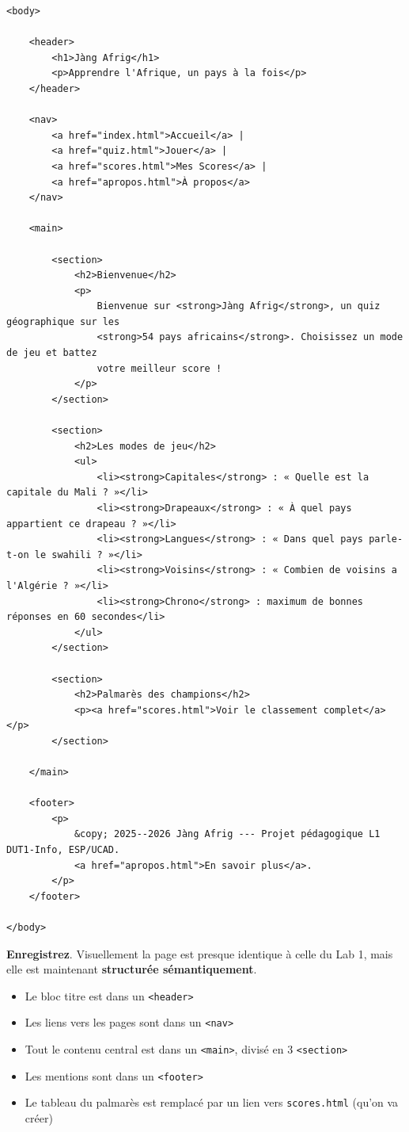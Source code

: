 \documentclass[11pt,a4paper]{article}
\newcommand{\cmark}{\ding{51}}
\begin{document}
\begin{lstlisting}[language=HTML5]
<body>

    <header>
        <h1>Jàng Afrig</h1>
        <p>Apprendre l'Afrique, un pays à la fois</p>
    </header>

    <nav>
        <a href="index.html">Accueil</a> |
        <a href="quiz.html">Jouer</a> |
        <a href="scores.html">Mes Scores</a> |
        <a href="apropos.html">À propos</a>
    </nav>

    <main>

        <section>
            <h2>Bienvenue</h2>
            <p>
                Bienvenue sur <strong>Jàng Afrig</strong>, un quiz géographique sur les
                <strong>54 pays africains</strong>. Choisissez un mode de jeu et battez
                votre meilleur score !
            </p>
        </section>

        <section>
            <h2>Les modes de jeu</h2>
            <ul>
                <li><strong>Capitales</strong> : « Quelle est la capitale du Mali ? »</li>
                <li><strong>Drapeaux</strong> : « À quel pays appartient ce drapeau ? »</li>
                <li><strong>Langues</strong> : « Dans quel pays parle-t-on le swahili ? »</li>
                <li><strong>Voisins</strong> : « Combien de voisins a l'Algérie ? »</li>
                <li><strong>Chrono</strong> : maximum de bonnes réponses en 60 secondes</li>
            </ul>
        </section>

        <section>
            <h2>Palmarès des champions</h2>
            <p><a href="scores.html">Voir le classement complet</a></p>
        </section>

    </main>

    <footer>
        <p>
            &copy; 2025--2026 Jàng Afrig --- Projet pédagogique L1 DUT1-Info, ESP/UCAD.
            <a href="apropos.html">En savoir plus</a>.
        </p>
    </footer>

</body>
\end{lstlisting}

\textbf{Enregistrez}. Visuellement la page est presque identique à celle
du Lab 1, mais elle est maintenant \textbf{structurée sémantiquement}. \cmark

\begin{retenirbox}
\begin{itemize}[nosep]
    \item Le bloc titre est dans un \texttt{<header>}
    \item Les liens vers les pages sont dans un \texttt{<nav>}
    \item Tout le contenu central est dans un \texttt{<main>}, divisé en 3 \texttt{<section>}
    \item Les mentions sont dans un \texttt{<footer>}
    \item Le tableau du palmarès est remplacé par un lien vers \texttt{scores.html} (qu'on va créer)
\end{itemize}
\end{retenirbox}
\end{document}
